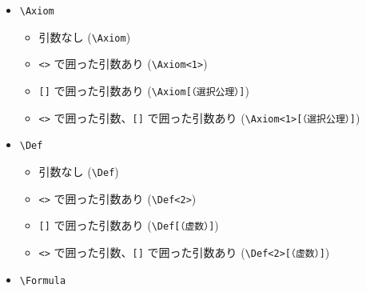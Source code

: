 \documentclass[oneside,10pt,a4paper]{jsarticle}
\begin{document}
  \begin{itemize}
    \item \verb|\Axiom|
      \begin{itemize}
        \item 引数なし (\verb|\Axiom|)
          \begin{quote}
            \Axiom
          \end{quote}
        \item \verb|<>| で囲った引数あり (\verb|\Axiom<1>|)
          \begin{quote}
          \end{quote}
        \item \verb|[]| で囲った引数あり (\verb|\Axiom[（選択公理）]|)
          \begin{quote}
            \Axiom[（選択公理）]
          \end{quote}
        \item \verb|<>| で囲った引数、\verb|[]| で囲った引数あり (\verb|\Axiom<1>[（選択公理）]|)
          \begin{quote}
          \end{quote}
      \end{itemize}
    \item \verb|\Def|
      \begin{itemize}
        \item 引数なし (\verb|\Def|)
          \begin{quote}
            \Def
          \end{quote}
        \item \verb|<>| で囲った引数あり (\verb|\Def<2>|)
          \begin{quote}
          \end{quote}
        \item \verb|[]| で囲った引数あり (\verb|\Def[（虚数）]|)
          \begin{quote}
            \Def[（虚数）]
          \end{quote}
        \item \verb|<>| で囲った引数、\verb|[]| で囲った引数あり (\verb|\Def<2>[（虚数）]|)
          \begin{quote}
          \end{quote}
      \end{itemize}
    \newpage
    \item \verb|\Formula|
      \begin{itemize}

\end{itemize}
\end{itemize}
\end{document}
